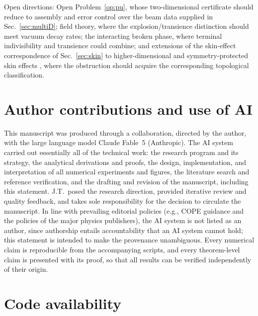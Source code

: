 \documentclass[11pt]{article}
\theoremstyle{definition}
\theoremstyle{remark}
\begin{document}
Open directions: Open Problem~\ref{op:pu}, whose two-dimensional
certificate should reduce to assembly and error control over the beam
data supplied in Sec.~\ref{sec:multiD}; field theory, where the
explosion/transience distinction should meet vacuum decay rates; the
interacting broken phase, where terminal indivisibility and transience
could combine; and extensions of the skin-effect correspondence of
Sec.~\ref{sec:skin} to higher-dimensional and symmetry-protected skin
effects \cite{Okuma2020}, where the obstruction should acquire the
corresponding topological classification.

\section*{Author contributions and use of AI}

This manuscript was produced through a collaboration, directed by the
author, with the large language model Claude Fable~5 (Anthropic). The AI system
carried out essentially all of the technical work: the research program
and its strategy, the analytical derivations and proofs, the design,
implementation, and interpretation of all numerical experiments and
figures, the literature search and reference verification, and the
drafting and revision of the manuscript, including this statement.
J.T.\ posed the research direction, provided iterative review and
quality feedback, and takes sole responsibility for the decision to
circulate the manuscript. In line with prevailing editorial policies
(e.g., COPE guidance and the policies of the major physics publishers),
the AI system is not listed as an author, since authorship entails
accountability that an AI system cannot hold; this statement is intended
to make the provenance unambiguous. Every numerical claim is
reproducible from the accompanying scripts, and every theorem-level
claim is presented with its proof, so that all results can be verified
independently of their origin.

\section*{Code availability}
\label{sec:code}
\end{document}
